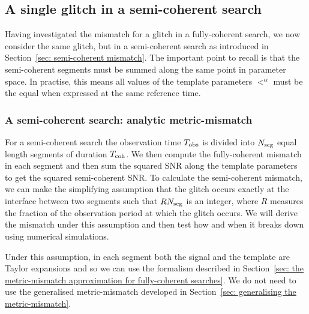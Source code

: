 \documentclass[../full_thesis/full_thesis.tex]{subfiles}
\begin{document}
\subsection{A single glitch in a semi-coherent search}

Having investigated the mismatch for a glitch in a fully-coherent search, we
now consider the same glitch, but in a semi-coherent search as introduced in
Section~\ref{sec: semi-coherent mismatch}. The important
point to recall is that the semi-coherent segments must be summed along the
same point in parameter space. In practise, this means all values of the
template parameters $\lt^{\alpha}$ must be the equal when expressed at the same
reference time.

\subsubsection{A semi-coherent search: analytic metric-mismatch}
\label{sec: semi-coherent searches: analytic mismatch}

For a semi-coherent search the observation time $T_{\mathrm{obs}}$ is
divided into $N_{\textrm{seg}}$ equal length segments of duration $T_{\mathrm{coh}}$. We then compute
the fully-coherent mismatch in each segment and then sum the squared SNR along the template
parameters to get the squared semi-coherent SNR. To calculate
the semi-coherent mismatch, we can make the simplifying assumption that the
glitch occurs exactly at the interface between two segments such that $RN_{\textrm{seg}}$
is an integer, where $R$ measures the fraction of the observation period at
which the glitch occurs. We will derive the mismatch under this assumption and
then test how and when it breaks down using numerical simulations.

Under this assumption, in each segment both the signal and the template are
Taylor expansions and so we can use the \citet{Brady1998} formalism described
in Section~\ref{sec: the metric-mismatch approximation for fully-coherent
searches}. We do not need to use the generalised metric-mismatch developed in
Section~\ref{sec: generalising the metric-mismatch}.
\end{document}
